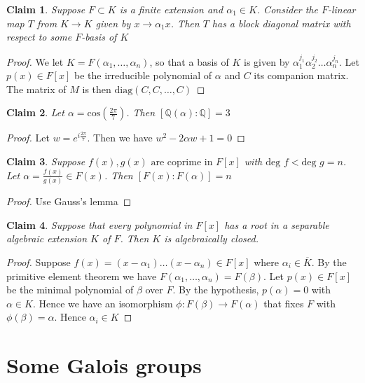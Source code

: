 \documentclass{article}
\newtheorem{claim}{Claim}
\begin{document}
\begin{claim}
  Suppose $F \subset K$ is a finite extension and $\alpha_1 \in K$. Consider the $F$-linear map $T$ from $K \to K$ given by $x \to \alpha_1 x$. 
  Then $T$ has a block diagonal matrix with respect to some $F$-basis of $K$
\end{claim}

\begin{proof}
  We let $K=F(\alpha_1,\dots,\alpha_n)$, so that a basis of $K$ is given by $\alpha_1^{j_1}\alpha_2^{j_2}\dots \alpha_n^{j_n}$. 
  Let $p(x) \in F[x]$ be the irreducible polynomial of $\alpha$ and $C$ its companion matrix. 
  The matrix of $M$ is then $\text{diag}(C,C,\dots,C)$
\end{proof}

\begin{claim}
  Let $\alpha = \text{cos}(\frac{2\pi}{7})$. Then $[\mathbb{Q}(\alpha):\mathbb{Q}]=3$
\end{claim}

\begin{proof}
  Let $w = e^{i\frac{2\pi}{7}}$. Then we have $w^2-2\alpha w +1 =0$
\end{proof}

\begin{claim}
  Suppose $f(x),g(x) \text{ are coprime in }F[x]$ with $\text{deg } f < \text{deg } g=n$. Let $\alpha=\frac{f(x)}{g(x)} \in F(x)$. Then $[F(x):F(\alpha)]=n$
\end{claim}

\begin{proof}
  Use Gauss's lemma
\end{proof}

\begin{claim}
  Suppose that every polynomial in $F[x]$ has a root in a separable algebraic extension $K$ of $F$. Then $K$ is algebraically closed.
\end{claim}

\begin{proof}
  Suppose $f(x)=(x-\alpha_1)\dots(x-\alpha_n) \in F[x]$ where $\alpha_i \in \overline{K}$. 
  By the primitive element theorem we have $F(\alpha_1, \dots,  \alpha_n)= F(\beta)$. 
  Let $p(x) \in F[x]$ be the  minimal polynomial of $\beta$ over $F$. 
  By the hypothesis, $p(\alpha)=0$ with $\alpha \in K$. 
  Hence we have an isomorphism $\phi:F(\beta) \to F(\alpha)$ that fixes $F$ with $\phi(\beta)=\alpha$. 
  Hence $\alpha_i \in K$
\end{proof}

\section{Some Galois groups}
\end{document}
